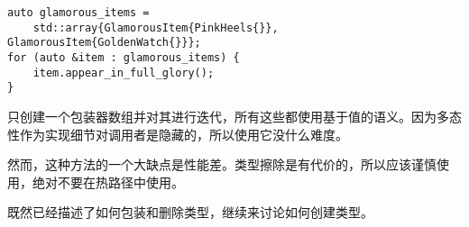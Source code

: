 \begin{lstlisting}[style=styleCXX]
auto glamorous_items =
	std::array{GlamorousItem{PinkHeels{}}, GlamorousItem{GoldenWatch{}}};
for (auto &item : glamorous_items) {
	item.appear_in_full_glory();
}
\end{lstlisting}

只创建一个包装器数组并对其进行迭代，所有这些都使用基于值的语义。因为多态性作为实现细节对调用者是隐藏的，所以使用它没什么难度。

然而，这种方法的一个大缺点是性能差。类型擦除是有代价的，所以应该谨慎使用，绝对不要在热路径中使用。

既然已经描述了如何包装和删除类型，继续来讨论如何创建类型。

















